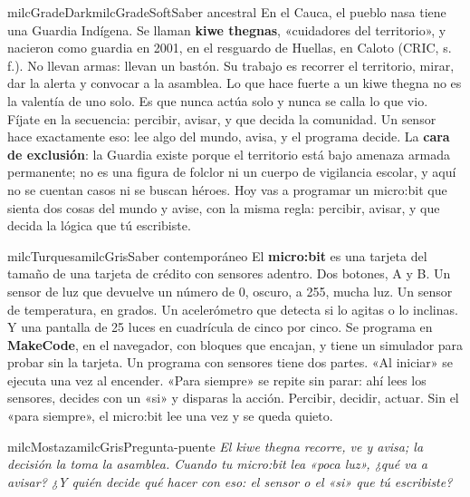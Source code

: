 \documentclass[11pt,letterpaper]{article}
\begin{document}
\begin{softbox}{milcGradeDark}{milcGradeSoft}{Saber ancestral}
En el Cauca, el pueblo nasa tiene una Guardia Indígena. Se llaman \textbf{kiwe thegnas}, «cuidadores del territorio», y nacieron como guardia en 2001, en el resguardo de Huellas, en Caloto (CRIC, s.\,f.). No llevan armas: llevan un bastón. Su trabajo es recorrer el territorio, mirar, dar la alerta y convocar a la asamblea. Lo que hace fuerte a un kiwe thegna no es la valentía de uno solo. Es que nunca actúa solo y nunca se calla lo que vio. Fíjate en la secuencia: percibir, avisar, y que decida la comunidad. Un sensor hace exactamente eso: lee algo del mundo, avisa, y el programa decide. La \textbf{cara de exclusión}: la Guardia existe porque el territorio está bajo amenaza armada permanente; no es una figura de folclor ni un cuerpo de vigilancia escolar, y aquí no se cuentan casos ni se buscan héroes. Hoy vas a programar un micro:bit que sienta dos cosas del mundo y avise, con la misma regla: percibir, avisar, y que decida la lógica que tú escribiste.\par{}
\end{softbox}

\begin{softbox}{milcTurquesa}{milcGris}{Saber contemporáneo}
El \textbf{micro:bit} es una tarjeta del tamaño de una tarjeta de crédito con sensores adentro. Dos botones, A y B. Un sensor de luz que devuelve un número de 0, oscuro, a 255, mucha luz. Un sensor de temperatura, en grados. Un acelerómetro que detecta si lo agitas o lo inclinas. Y una pantalla de 25 luces en cuadrícula de cinco por cinco. Se programa en \textbf{MakeCode}, en el navegador, con bloques que encajan, y tiene un simulador para probar sin la tarjeta. Un programa con sensores tiene dos partes. «Al iniciar» se ejecuta una vez al encender. «Para siempre» se repite sin parar: ahí lees los sensores, decides con un «si» y disparas la acción. Percibir, decidir, actuar. Sin el «para siempre», el micro:bit lee una vez y se queda quieto.
\end{softbox}

\begin{softbox}{milcMostaza}{milcGris}{Pregunta-puente}
\textit{El kiwe thegna recorre, ve y avisa; la decisión la toma la asamblea. Cuando tu micro:bit lea «poca luz», ¿qué va a avisar? ¿Y quién decide qué hacer con eso: el sensor o el «si» que tú escribiste?}
\end{softbox}
\end{document}
